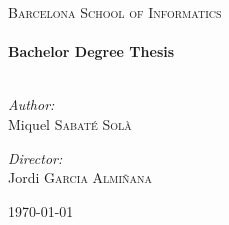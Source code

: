 %
%
%


\begin{titlepage}
\begin{center}

\textsc{\Large Barcelona School of Informatics}\\[0.5cm]

{ \small \HRule \\[0.4cm] }
{ \huge \bf Bachelor Degree Thesis \\[0.4cm] }
{ \small \HRule \\[0.4cm] }

\begin{minipage}{0.4\textwidth}
\begin{flushleft} \large
\emph{Author:}\\
Miquel \textsc{Sabaté Solà}
\end{flushleft}
\end{minipage}
\begin{minipage}{0.4\textwidth}
\begin{flushright} \large
\emph{Director:} \\
Jordi \textsc{Garcia Almiñana}
\end{flushright}
\end{minipage}

\vfill

{\large \today}

\end{center}
\end{titlepage}
